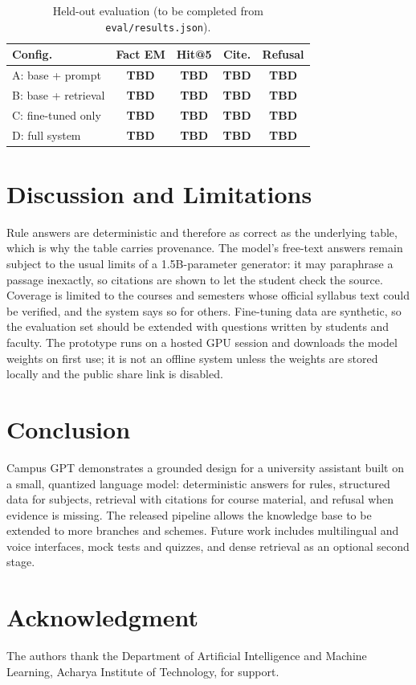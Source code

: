 \documentclass[conference]{IEEEtran}
\newcommand{\tbd}{\textbf{TBD}}
\begin{document}
\begin{table}[t]
\caption{Held-out evaluation (to be completed from \texttt{eval/results.json}).}
\label{tab:results}
\centering
\begin{tabular}{lcccc}
\toprule
Config. & Fact EM & Hit@5 & Cite. & Refusal\\
\midrule
A: base + prompt & \tbd & \tbd & \tbd & \tbd\\
B: base + retrieval & \tbd & \tbd & \tbd & \tbd\\
C: fine-tuned only & \tbd & \tbd & \tbd & \tbd\\
D: full system & \tbd & \tbd & \tbd & \tbd\\
\bottomrule
\end{tabular}
\end{table}

\section{Discussion and Limitations}
Rule answers are deterministic and therefore as correct as the underlying table, which is why the table carries provenance. The model's free-text answers remain subject to the usual limits of a 1.5B-parameter generator: it may paraphrase a passage inexactly, so citations are shown to let the student check the source. Coverage is limited to the courses and semesters whose official syllabus text could be verified, and the system says so for others. Fine-tuning data are synthetic, so the evaluation set should be extended with questions written by students and faculty. The prototype runs on a hosted GPU session and downloads the model weights on first use; it is not an offline system unless the weights are stored locally and the public share link is disabled.

\section{Conclusion}
Campus GPT demonstrates a grounded design for a university assistant built on a small, quantized language model: deterministic answers for rules, structured data for subjects, retrieval with citations for course material, and refusal when evidence is missing. The released pipeline allows the knowledge base to be extended to more branches and schemes. Future work includes multilingual and voice interfaces, mock tests and quizzes, and dense retrieval as an optional second stage.

\section*{Acknowledgment}
The authors thank the Department of Artificial Intelligence and Machine Learning, Acharya Institute of Technology, for support.
\end{document}
